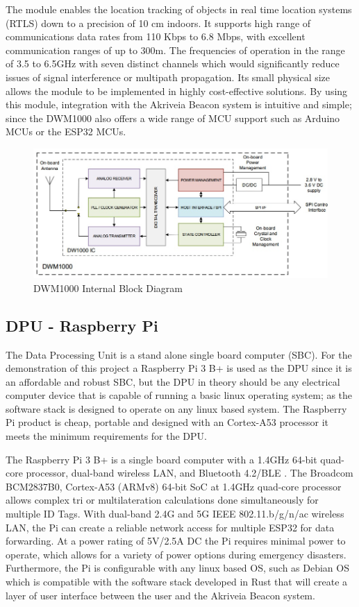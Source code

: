 The module enables the location tracking of objects in real time location systems (RTLS) down to a precision of 10 cm indoors. It supports high range of communications data rates from 110 Kbps to 6.8 Mbps, with excellent communication ranges of up to 300m. The frequencies of operation in the range of 3.5 to 6.5GHz with seven distinct channels which would significantly reduce issues of signal interference or multipath propagation. Its small physical size allows the module to be implemented in highly cost-effective solutions. By using this module, integration with the Akriveia Beacon system is intuitive and simple; since the DWM1000 also offers a wide range of MCU support such as Arduino MCUs or the ESP32 MCUs. 

\medskip
\begin{figure}[H]
\centering
    \includegraphics[scale=0.7]{./images/dwm1000_bd.jpg}
    \caption{DWM1000 Internal Block Diagram}
    \label{dwm1000_bd}
\end{figure}



\pagebreak
\subsection{DPU - Raspberry Pi}
\medskip
The Data Processing Unit is a stand alone single board computer (SBC). For the demonstration of this project a Raspberry Pi 3 B+ is used as the DPU since it is an affordable and robust SBC, but the DPU in theory should be any electrical computer device that is capable of running a basic linux operating system; as the software stack is designed to operate on any linux based system. The Raspberry Pi product is cheap, portable and designed with an Cortex-A53 processor it meets the minimum requirements for the DPU.

\bigskip
The Raspberry Pi 3 B+ is a single board computer with a 1.4GHz 64-bit quad-core processor, dual-band wireless LAN, and Bluetooth 4.2/BLE \cite{R3-3-1}. The Broadcom BCM2837B0, Cortex-A53 (ARMv8) 64-bit SoC at 1.4GHz quad-core processor allows complex tri or multilateration calculations done simultaneously for multiple ID Tags. With dual-band 2.4G and 5G IEEE 802.11.b/g/n/ac wireless LAN, the Pi can create a reliable network access for multiple ESP32 for data forwarding. At a power rating of 5V/2.5A \Gls{DC} the Pi requires minimal power to operate, which allows for a variety of power options during emergency disasters. Furthermore, the Pi is configurable with any linux based OS, such as Debian OS which is compatible with the software stack developed in Rust that will create a layer of user interface between the user and the Akriveia Beacon system.


